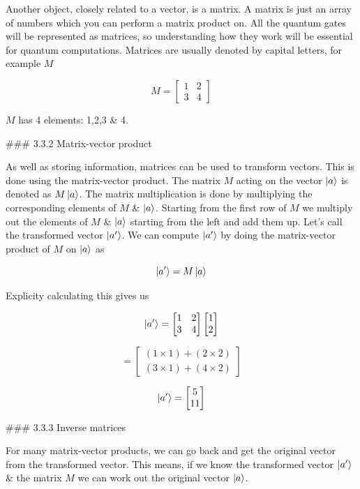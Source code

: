 \documentclass{book}
\begin{document}
Another object, closely related to a vector, is a matrix. A matrix is just an array of numbers which you can perform a matrix product on. All the quantum gates will be represented as matrices, so understanding how they work will be essential for quantum computations. Matrices are usually denoted by capital letters, for example $M$

$$
M = \begin{bmatrix} 1 & 2  \\ 3 & 4 \end{bmatrix}
$$

$M$ has 4 elements: 1,2,3 & 4. 

### 3.3.2 Matrix-vector product 

As well as storing information, matrices can be used to transform vectors. This is done using the matrix-vector product. The matrix $M$ acting on the vector $\ket{a}$ is denoted as $M\ket{a}$. The matrix multiplication is done by multiplying the corresponding elements of $M$ & $\ket{a}$. Starting from the first row of $M$ we multiply out the elements of $M$ & $\ket{a}$ starting from the left and add them up. Let's call the transformed vector $\ket{a'}$. We can compute $\ket{a'}$ by doing the matrix-vector product of $M$ on $\ket{a}$ as


$$
\ket{a'} = M\ket{a}
$$

Explicity calculating this gives us

$$
\ket{a'} =  \begin{bmatrix} 1 & 2  \\ 3 & 4 \end{bmatrix} \begin{bmatrix} 1 \\ 2 \end{bmatrix}
$$

$$
= \begin{bmatrix} (1 \times 1) + (2 \times 2) \\ (3 \times 1) + (4 \times 2) \end{bmatrix}
$$

$$
\ket{a'} = \begin{bmatrix} 5 \\ 11 \end{bmatrix}
$$

### 3.3.3 Inverse matrices

For many matrix-vector products, we can go back and get the original vector from the transformed vector. This means, if we know the transformed vector $\ket{a'}$ &  the matrix $M$ we can work out the original vector $\ket{a}$. 
\end{document}
